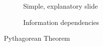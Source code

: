 \documentclass[twoside, 12pt]{article}
\begin{document}
\begin{figure}[H]
        \centering
        \begin{subfigure}[b]{0.45\textwidth}
			   \caption{Simple, explanatory slide}
                \label{fig:Annie-presentation-teacher}
        \end{subfigure}%
        \qquad %
        \begin{subfigure}[b]{0.45\textwidth}
		  \caption{Information dependencies}
                \label{fig:Annie-presentation-information}
        \end{subfigure}
        \caption{Pythagorean Theorem}\label{fig:PythagoreanTheorem}
\end{figure}
\end{document}
